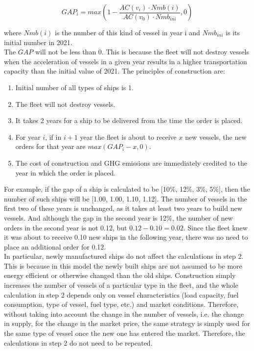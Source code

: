 \documentclass[a4paper,12pt]{article}
\begin{document}
\begin{equation}
	\label{eq:gap}
	GAP_{i} = max(1 - \frac{AC(v_i) \cdot Nmb(i)}{AC(v_0) \cdot Nmb_{ini}}, 0)
\end{equation}

where $Nmb(i)$ is the number of this kind of vessel in year i and $Nmb_{ini}$ is its initial number in 2021.\\

The $GAP$ will not be less than 0.
This is because the fleet will not destroy vessels when the acceleration of vessels in a given year results in a higher transportation capacity than the initial value of 2021.
The principles of construction are:
\begin{enumerate}
	\item Initial number of all types of ships is 1.
	\item The fleet will not destroy vessels.
	\item It takes 2 years for a ship to be delivered from the time the order is placed.
	\item For year $i$, if in $i+1$ year the fleet is about to receive $x$ new vessels, the new orders for that year are $max(GAP_i - x, 0)$.
	\item The cost of construction and GHG emissions are immediately credited to the year in which the order is placed.
\end{enumerate}


For example, if the gap of a ship is calculated to be [10\%, 12\%, 3\%, 5\%], then the number of such ships will be [1.00, 1.00, 1.10, 1.12].
The number of vessels in the first two of these years is unchanged, as it takes at least two years to build new vessels.
And although the gap in the second year is 12\%, the number of new orders in the second year is not 0.12, but $0.12-0.10=0.02$.
Since the fleet knew it was about to receive 0.10 new ships in the following year, there was no need to place an additional order for 0.12.\\

In particular, newly manufactured ships do not affect the calculations in step 2.
This is because in this model the newly built ships are not assumed to be more energy efficient or otherwise changed than the old ships.
Construction simply increases the number of vessels of a particular type in the fleet, and the whole calculation in step 2 depends only on vessel characteristics (load capacity, fuel consumption, type of vessel, fuel type, etc.) and market conditions.
Therefore, without taking into account the change in the number of vessels, i.e. the change in supply, for the change in the market price, the same strategy is simply used for the same type of vessel once the new one has entered the market.
Therefore, the calculations in step 2 do not need to be repeated.
\end{document}
